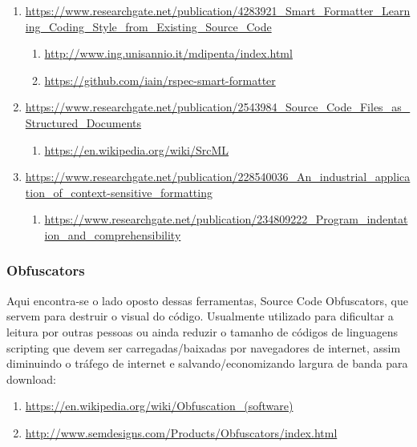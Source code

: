 \begin{sloppypar}
\begin{myquote}
\begin{enumerate}[leftmargin=*,parsep=0pt]
    \item \url{https://www.researchgate.net/publication/4283921_Smart_Formatter_Learning_Coding_Style_from_Existing_Source_Code}
    \begin{enumerate}[nolistsep,topsep=0pt,label=$\star$]
        \item \url{http://www.ing.unisannio.it/mdipenta/index.html}
        \item \url{https://github.com/iain/rspec-smart-formatter}
    \end{enumerate}

    \item \url{https://www.researchgate.net/publication/2543984_Source_Code_Files_as_Structured_Documents}
    \begin{enumerate}[nolistsep,topsep=0pt,label=$\star$]
        \item \url{https://en.wikipedia.org/wiki/SrcML}
    \end{enumerate}

    \item \url{https://www.researchgate.net/publication/228540036_An_industrial_application_of_context-sensitive_formatting}
    \begin{enumerate}[nolistsep,topsep=0pt,label=$\star$]
        \item \url{https://www.researchgate.net/publication/234809222_Program_indentation_and_comprehensibility}
    \end{enumerate}

    \end{enumerate}
    \end{myquote}
    \end{sloppypar}


\subsubsection{Obfuscators}

    Aqui encontra-se o lado oposto dessas ferramentas, Source Code Obfuscators, que servem para
    destruir o visual do código. Usualmente utilizado para dificultar a leitura por outras pessoas
    ou ainda reduzir o tamanho de códigos de linguagens scripting que devem ser carregadas/baixadas
    por navegadores de internet, assim diminuindo o tráfego de internet e salvando/economizando
    largura de banda para download:

    \begin{sloppypar}
    \begin{myquote}\RaggedRight
    \begin{enumerate}[leftmargin=*,parsep=0pt]

    \item \url{https://en.wikipedia.org/wiki/Obfuscation_(software)}

    \item \url{http://www.semdesigns.com/Products/Obfuscators/index.html}

    \end{enumerate}
    \end{myquote}
    \end{sloppypar}

